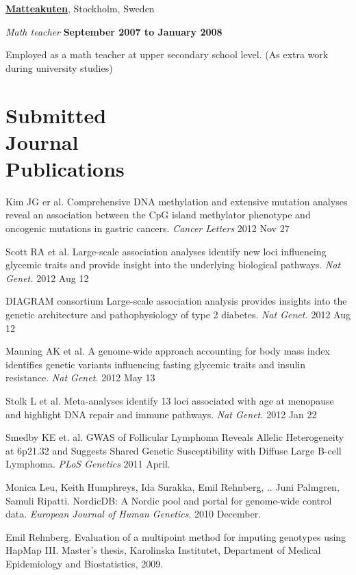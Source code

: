\halfblankline

\href{http://www.matteakuten.se}{\textbf{Matteakuten}}, Stockholm, Sweden
\begin{outerlist}
\item[] \textit{Math teacher}%
        \hfill \textbf{September 2007 to January 2008}
\begin{innerlist}
\item Employed as a math teacher at upper secondary school level. (As extra work during university studies)
\end{innerlist}

\end{outerlist}

%
%
\section{Submitted\\Journal\\Publications} \begin{bibsection}
\item Kim JG er al.
	Comprehensive DNA methylation and extensive mutation analyses reveal an association between the CpG island methylator phenotype and oncogenic mutations in gastric cancers.
	\emph{Cancer Letters} 2012 Nov 27
\item Scott RA et al.
	Large-scale association analyses identify new loci influencing glycemic traits and provide insight into the underlying biological pathways.
	\emph{Nat Genet.} 2012 Aug 12
    \item DIAGRAM consortium
	Large-scale association analysis provides insights into the genetic architecture and pathophysiology of type 2 diabetes.
	\emph{Nat Genet.} 2012 Aug 12
    \item Manning AK et al.
	A genome-wide approach accounting for body mass index identifies genetic variants influencing fasting glycemic traits and insulin resistance.
	\emph{Nat Genet.} 2012 May 13
    \item Stolk L et al.
	Meta-analyses identify 13 loci associated with age at menopause and highlight DNA repair and immune pathways.
	\emph{Nat Genet.} 2012 Jan 22
    \item Smedby KE et. al.
	GWAS of Follicular Lymphoma Reveals Allelic Heterogeneity at 6p21.32 and Suggests Shared Genetic Susceptibility with Diffuse Large B-cell Lymphoma.
	\emph{PLoS Genetics} 2011 April.
    \item Monica Leu, Keith Humphreys, Ida Surakka, Emil Rehnberg, .. Juni Palmgren, Samuli Ripatti.
	NordicDB: A Nordic pool and portal for genome-wide control data.
	\emph{European Journal of Human Genetics}. 2010 December.
    \item Emil Rehnberg.
	Evaluation of a multipoint method for imputing genotypes using HapMap III.
	Master’s thesis, Karolinska Institutet, Department of Medical Epidemiology and Biostatistics, 2009.
\end{bibsection}

